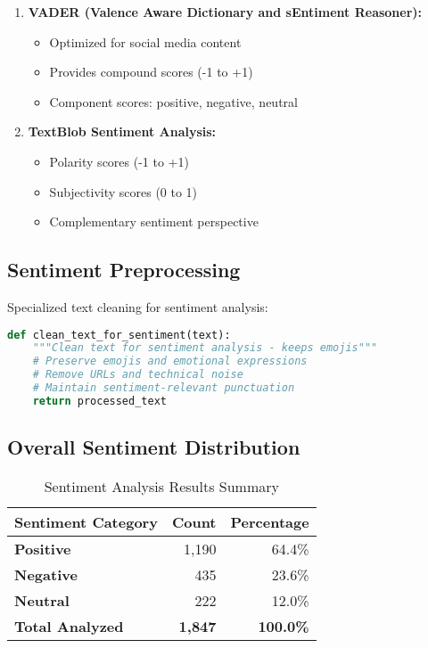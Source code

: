 \documentclass[12pt,a4paper]{article}
\begin{document}
\begin{enumerate}
\item \textbf{VADER (Valence Aware Dictionary and sEntiment Reasoner):}
   \begin{itemize}
   \item Optimized for social media content
   \item Provides compound scores (-1 to +1)
   \item Component scores: positive, negative, neutral
   \end{itemize}

\item \textbf{TextBlob Sentiment Analysis:}
   \begin{itemize}
   \item Polarity scores (-1 to +1)
   \item Subjectivity scores (0 to 1)
   \item Complementary sentiment perspective
   \end{itemize}
\end{enumerate}

\subsection{Sentiment Preprocessing}

Specialized text cleaning for sentiment analysis:
\begin{lstlisting}[language=Python, caption=Sentiment Text Preprocessing]
def clean_text_for_sentiment(text):
    """Clean text for sentiment analysis - keeps emojis"""
    # Preserve emojis and emotional expressions
    # Remove URLs and technical noise
    # Maintain sentiment-relevant punctuation
    return processed_text
\end{lstlisting}

\subsection{Overall Sentiment Distribution}

\begin{table}[H]
\centering
\caption{Sentiment Analysis Results Summary}
\begin{tabular}{@{}lrr@{}}
\toprule
\textbf{Sentiment Category} & \textbf{Count} & \textbf{Percentage} \\
\midrule
\textcolor{poscolor}{\textbf{Positive}} & 1,190 & 64.4\% \\
\textcolor{negcolor}{\textbf{Negative}} & 435 & 23.6\% \\
\textcolor{neucolor}{\textbf{Neutral}} & 222 & 12.0\% \\
\midrule
\textbf{Total Analyzed} & \textbf{1,847} & \textbf{100.0\%} \\
\bottomrule
\end{tabular}
\end{table}
\end{document}
